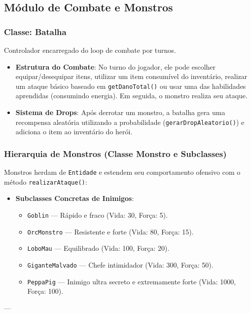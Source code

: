 \documentclass[12pt,a4paper]{article}
\begin{document}
\subsection{Módulo de Combate e Monstros}

\subsubsection{Classe: Batalha}
Controlador encarregado do loop de combate por turnos.
\begin{itemize}
    \item \textbf{Estrutura do Combate}:
    No turno do jogador, ele pode escolher equipar/desequipar itens, utilizar um item consumível do inventário, realizar um ataque básico baseado em \texttt{getDanoTotal()} ou usar uma das habilidades aprendidas (consumindo energia). Em seguida, o monstro realiza seu ataque.
    \item \textbf{Sistema de Drops}:
    Após derrotar um monstro, a batalha gera uma recompensa aleatória utilizando a probabilidade (\texttt{gerarDropAleatorio()}) e adiciona o item ao inventário do herói.
\end{itemize}

\subsubsection{Hierarquia de Monstros (Classe Monstro e Subclasses)}
Monstros herdam de \texttt{Entidade} e estendem seu comportamento ofensivo com o método \texttt{realizarAtaque()}:
\begin{itemize}
    \item \textbf{Subclasses Concretas de Inimigos}:
    \begin{itemize}
        \item \texttt{Goblin} --- Rápido e fraco (Vida: 30, Força: 5).
        \item \texttt{OrcMonstro} --- Resistente e forte (Vida: 80, Força: 15).
        \item \texttt{LoboMau} --- Equilibrado (Vida: 100, Força: 20).
        \item \texttt{GiganteMalvado} --- Chefe intimidador (Vida: 300, Força: 50).
        \item \texttt{PeppaPig} --- Inimigo ultra secreto e extremamente forte (Vida: 1000, Força: 100).
    \end{itemize}
\end{itemize}

---
\end{document}
